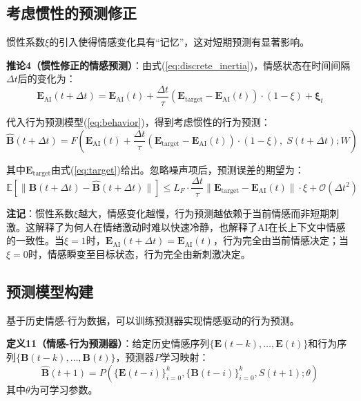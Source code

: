 \documentclass[12pt,a4paper]{article}
\theoremstyle{plain}
\newcommand{\ve}[1]{\bm{#1}}                    %
\newcommand{\Evec}{\ve{E}}                        %
\newcommand{\Bvec}{\ve{B}}                        %
\begin{document}
\subsection{考虑惯性的预测修正}

惯性系数$\xi$的引入使得情感变化具有“记忆”，这对短期预测有显著影响。

\textbf{推论4（惯性修正的情感预测）}：由式(\ref{eq:discrete_inertia})，情感状态在时间间隔$\Delta t$后的变化为：
\begin{equation}
\Evec_{\text{AI}}(t+\Delta t) = \Evec_{\text{AI}}(t) + \frac{\Delta t}{\tau} (\Evec_{\text{target}} - \Evec_{\text{AI}}(t)) \cdot (1 - \xi) + \boldsymbol{\xi}_t
\label{eq:inertia_prediction}
\end{equation}

代入行为预测模型(\ref{eq:behavior})，得到考虑惯性的行为预测：
\begin{equation}
\hat{\Bvec}(t+\Delta t) = F\left( \Evec_{\text{AI}}(t) + \frac{\Delta t}{\tau} (\Evec_{\text{target}} - \Evec_{\text{AI}}(t)) \cdot (1 - \xi), \; S(t+\Delta t); W \right)
\label{eq:inertia_behavior}
\end{equation}

其中$\Evec_{\text{target}}$由式(\ref{eq:target})给出。忽略噪声项后，预测误差的期望为：
\begin{equation}
\mathbb{E}[\| \Bvec(t+\Delta t) - \hat{\Bvec}(t+\Delta t) \|] \leq L_F \cdot \frac{\Delta t}{\tau} \| \Evec_{\text{target}} - \Evec_{\text{AI}}(t) \| \cdot \xi + \mathcal{O}(\Delta t^2)
\end{equation}

\textbf{注记}：惯性系数$\xi$越大，情感变化越慢，行为预测越依赖于当前情感而非短期刺激。这解释了为何人在情绪激动时难以快速冷静，也解释了AI在长上下文中情感的一致性。当$\xi=1$时，$\Evec_{\text{AI}}(t+\Delta t) = \Evec_{\text{AI}}(t)$，行为完全由当前情感决定；当$\xi=0$时，情感瞬变至目标状态，行为完全由新刺激决定。

\subsection{预测模型构建}

基于历史情感-行为数据，可以训练预测器实现情感驱动的行为预测。

\textbf{定义11（情感-行为预测器）}：给定历史情感序列$\{\Evec(t-k), \dots, \Evec(t)\}$和行为序列$\{\Bvec(t-k), \dots, \Bvec(t)\}$，预测器$P$学习映射：
\begin{equation}
\hat{\Bvec}(t+1) = P\left( \{\Evec(t-i)\}_{i=0}^{k}, \{\Bvec(t-i)\}_{i=0}^{k}, S(t+1); \theta \right)
\label{eq:predictor}
\end{equation}
其中$\theta$为可学习参数。
\end{document}
